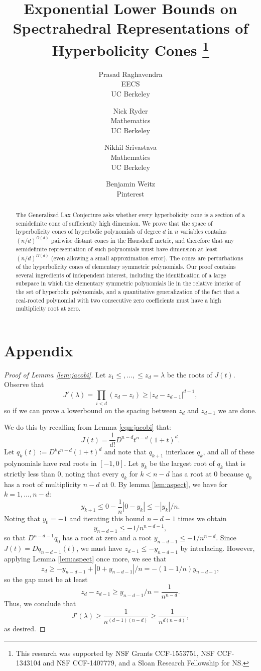 \documentclass[11pt]{article}
\title{Exponential Lower Bounds on Spectrahedral Representations of Hyperbolicity Cones \thanks{This research was supported by NSF Grants CCF-1553751,
 NSF CCF-1343104 and NSF CCF-1407779, and a Sloan Research Fellowship for NS.}}
\author{Prasad Raghavendra\\ EECS\\ UC Berkeley \and Nick Ryder\\Mathematics\\UC Berkeley \and Nikhil Srivastava\\Mathematics\\UC Berkeley \and Benjamin Weitz\\Pinterest}
\begin{document}
\maketitle
\begin{abstract}
The Generalized Lax Conjecture asks whether every hyperbolicity cone is a
	section of a semidefinite cone of sufficiently high dimension. We prove
	that the space of hyperbolicity cones of hyperbolic polynomials of
	degree $d$ in $n$ variables contains $(n/d)^{\Omega(d)}$ pairwise
	distant cones in the Hausdorff metric, and therefore that any semidefinite
	representation of such polynomials must have dimension at least
	$(n/d)^{\Omega(d)}$ (even allowing a small approximation error). The cones are perturbations of the hyperbolicity cones of
	elementary symmetric polynomials. Our proof contains several ingredients of
	independent interest, including the identification of a large subspace
	in which the elementary symmetric polynomials lie in the relative
	interior of the set of hyperbolic polynomials, and a quantitative
	generalization of the fact that a real-rooted polynomial with two
	consecutive zero coefficients must have a high multiplicity root at
	zero.
\end{abstract}

%





%
%
%

\appendix
\section*{Appendix}
\begin{proof}[Proof of Lemma \ref{lem:jacobi}]
Let $z_1\le,\ldots,\le z_d=\lambda$ be the roots of $J(t)$. Observe that
$$J'(\lambda) = \prod_{i<d}(z_d-z_i)\ge |z_d-z_{d-1}|^{d-1},$$
so if we can prove a lowerbound on the spacing between $z_d$ and $z_{d-1}$ we are done.

We do this by recalling from Lemma \ref{eqn:jacobi} that:
$$J(t)=\frac{1}{d!}D^{n-d}t^{n-d}(1+t)^{d}.$$
Let $q_k(t):=D^{k}t^{n-d}(1+t)^{d}$ and note that $q_{k+1}$ interlaces $q_k$, and all of these polynomials have real roots in $[-1,0]$. Let $y_k$ be the largest root of $q_k$ that is strictly less than $0$, noting that every $q_k$ for $k<{n-d}$ has a root at $0$ because $q_0$ has a root of multiplicity $n-d$ at $0$. By lemma \ref{lem:aspect}, we have for $k=1,\ldots,n-d$:
$$y_{k+1}\le 0-\frac{1}{n}|0-y_{k}|\le -|y_k|/n.$$
Noting that $y_0=-1$ and iterating this bound $n-d-1$ times we obtain
$$y_{n-d-1}\le -1/n^{n-d-1},$$
so that $D^{n-d-1}q_0$ has a root at zero and a root $y_{n-d-1}\le -1/n^{n-d}.$ Since $J(t)=Dq_{n-d-1}(t)$, we must have $z_{d-1}\le -y_{n-d-1}$ by interlacing. However, applying Lemma \ref{lem:aspect} once more, we see that
$$ z_d\ge -y_{n-d-1}+|0+y_{n-d-1}|/n = -(1-1/n)y_{n-d-1},$$
so the gap must be at least
$$z_d-z_{d-1}\ge y_{n-d-1}/n = \frac{1}{n^{n-d}}.$$
Thus, we conclude that
$$J'(\lambda)\ge \frac{1}{n^{(d-1)(n-d)}}\ge \frac{1}{n^{d(n-d)}},$$
as desired.
\end{proof}

\end{document}
